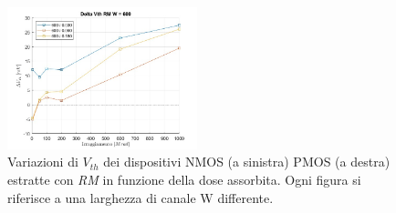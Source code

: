 \documentclass[
	a4paper,
	cleardoublepage=empty,
	headings=twolinechapter,
	numbers=autoenddot,
]{scrbook}
\begin{document}
\begin{figure}[H]
  \includegraphics[width=0.49\textwidth]{sovrapposizione-deltaVth-RM-P600}
  \caption{Variazioni di $V_{th}$ dei dispositivi NMOS (a sinistra) PMOS (a destra) estratte con \emph{RM} in funzione della dose assorbita. Ogni figura si riferisce a una larghezza di canale W differente.}
\end{figure}
\end{document}
